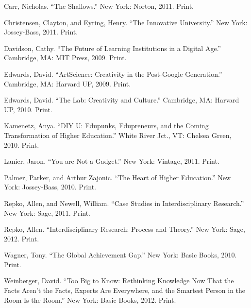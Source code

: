 \documentclass[letterpaper,10pt,headsepline]{scrreprt}
\begin{document}
Carr, Nicholas. ``The Shallows.'' New York: Norton, 2011. Print.

Christensen, Clayton, and Eyring, Henry. ``The Innovative University.'' New York: Jossey-Bass, 2011. Print.

Davidson, Cathy. ``The Future of Learning Institutions in a Digital Age.'' Cambridge, MA: MIT Press, 2009. Print.

Edwards, David. ``ArtScience: Creativity in the Post-Google Generation.'' Cambridge, MA: Harvard UP, 2009. Print.

Edwards, David. ``The Lab: Creativity and Culture.'' Cambridge, MA: Harvard UP, 2010. Print.

Kamenetz, Anya. ``DIY U: Edupunks, Edupreneurs, and the Coming Transformation of Higher Education.'' White River Jct., VT: Chelsea Green, 2010. Print.

Lanier, Jaron. ``You are Not a Gadget.'' New York: Vintage, 2011. Print.

Palmer, Parker, and Arthur Zajonic. ``The Heart of Higher Education.'' New York: Jossey-Bass, 2010. Print.

Repko, Allen, and Newell, William. ``Case Studies in Interdisciplinary Research.'' New York: Sage, 2011. Print.

Repko, Allen. ``Interdisciplinary Research: Process and Theory.'' New York: Sage, 2012. Print.

Wagner, Tony. ``The Global Achievement Gap.'' New York: Basic Books, 2010. Print.

Weinberger, David. ``Too Big to Know: Rethinking Knowledge Now That the Facts Aren't
the Facts, Experts Are Everywhere, and the Smartest Person in the Room Is the Room.'' New York: Basic Books, 2012. Print.
\end{document}
